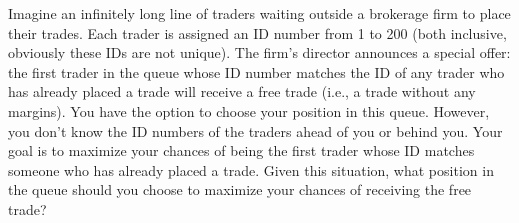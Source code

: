 \begin{que}
 Imagine an infinitely long line of traders waiting outside a brokerage firm to place their trades. Each trader is assigned an ID number from 1 to 200 (both   
 inclusive, obviously these IDs are not unique). The firm’s director announces a special offer: the first trader in the queue whose ID number matches the ID of any 
 trader who has already placed a trade will receive a free trade (i.e., a trade without any margins). You have the option to choose your position in this queue.   
 However, you don’t know the ID numbers of the traders ahead of you or behind you. Your goal is to maximize your chances of being the first trader whose ID matches 
 someone who has already placed a trade. Given this situation, what position in the queue should you choose to maximize your chances of receiving the free trade?
\end{que}
